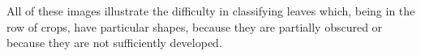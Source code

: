 \documentclass[../thesis.tex]{subfiles}
\begin{document}
    All of these images illustrate the difficulty in classifying leaves which, being in the row of crops, have particular shapes, because they are partially obscured or because they are not sufficiently developed.
    
    
    
\end{document}
